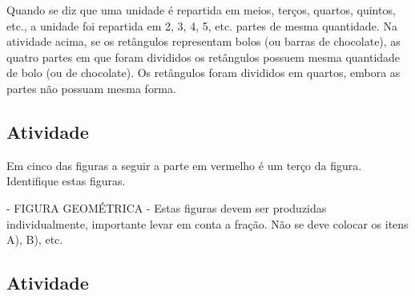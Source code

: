 \documentclass[a4,12pt]{book}
\begin{document}



\begin{refletindo*}[breakable]{}{}
  Quando se diz que uma unidade é repartida em meios, terços, quartos, quintos, etc., a unidade foi repartida em 2, 3, 4, 5, etc. partes de mesma quantidade.
  Na atividade acima, se os retângulos representam bolos (ou barras de chocolate), as quatro partes em que foram divididos os retângulos possuem mesma quantidade de bolo (ou de chocolate).
  Os retângulos foram divididos em quartos, embora as partes não possuam mesma forma.
\end{refletindo*}


\subsection{Atividade}








Em cinco das figuras a seguir a parte em vermelho é um terço da figura. Identifique estas figuras.
\begin{imagem*}[breakable]{}{}   - FIGURA GEOMÉTRICA - Estas figuras devem ser produzidas individualmente, importante levar em conta a fração. Não se deve colocar os itens A), B), etc.
\end{imagem*}







\subsection{Atividade}
\end{document}
